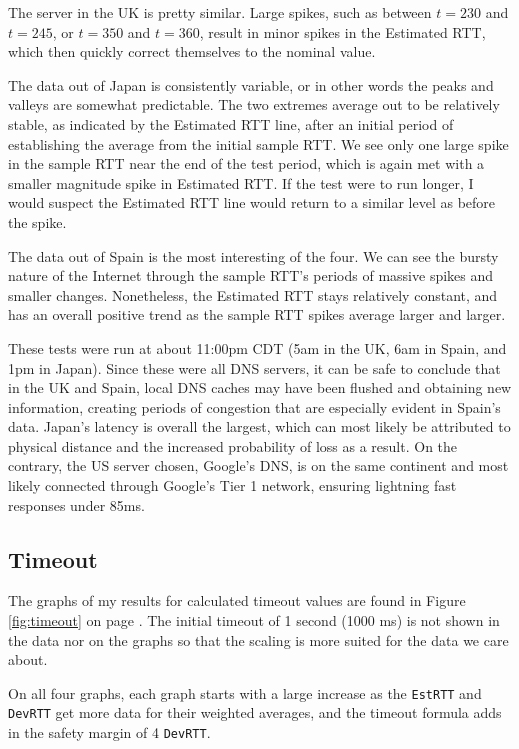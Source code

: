 \documentclass[11pt]{article}
\begin{document}
  The server in the UK is pretty similar. Large spikes, such as between $t=230$ and $t=245$, or 
  $t=350$ and $t=360$, result in minor spikes in the Estimated RTT, which then quickly correct themselves 
  to the nominal value.

  The data out of Japan is consistently variable, or in other words the peaks and valleys 
  are somewhat predictable. The two extremes average out to be relatively stable, as indicated 
  by the Estimated RTT line, after an initial period of establishing the average from the 
  initial sample RTT. We see only one large spike in the sample RTT near the end of the 
  test period, which is again met with a smaller magnitude spike in Estimated RTT. If 
  the test were to run longer, I would suspect the Estimated RTT line would return to 
  a similar level as before the spike.

  The data out of Spain is the most interesting of the four. We can see the bursty nature 
  of the Internet through the sample RTT's periods of massive spikes and smaller changes. 
  Nonetheless, the Estimated RTT stays relatively constant, and has an overall 
  positive trend as the sample RTT spikes average larger and larger.

  These tests were run at about 11:00pm CDT (5am in the UK, 6am in Spain, and 1pm in Japan). 
  Since these were all DNS servers, it can be safe to conclude that in the UK and Spain, 
  local DNS caches may have been flushed and obtaining new information, creating periods 
  of congestion that are especially evident in Spain's data. Japan's latency is overall 
  the largest, which can most likely be attributed to physical distance and the increased 
  probability of loss as a result. On the contrary, the US server chosen, Google's DNS, 
  is on the same continent and most likely connected through Google's Tier 1 network, 
  ensuring lightning fast responses under 85ms.

  \subsection{Timeout}

  The graphs of my results for calculated timeout values are found in Figure \ref{fig:timeout} 
  on page \pageref{fig:timeout}. The initial timeout of 1 second (1000 ms) is not shown in the 
  data nor on the graphs so that the scaling is more suited for the data we care about.

  On all four graphs, each graph starts with a large increase as the \texttt{EstRTT} and \texttt{DevRTT} 
  get more data for their weighted averages, and the timeout formula adds in the safety margin 
  of 4 \texttt{DevRTT}.
\end{document}
